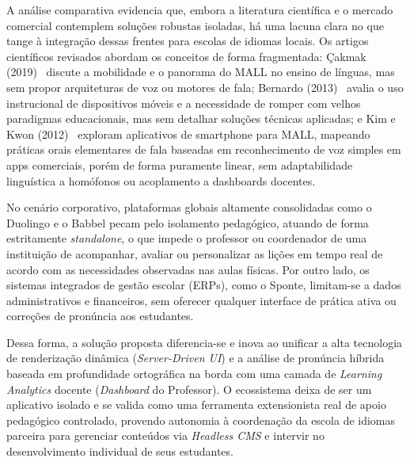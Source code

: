 \documentclass[portuguese]{sbcreviews-2025}%
\begin{document}
A análise comparativa evidencia que, embora a literatura científica e o mercado comercial contemplem soluções robustas isoladas, há uma lacuna clara no que tange à integração dessas frentes para escolas de idiomas locais. Os artigos científicos revisados abordam os conceitos de forma fragmentada: Çakmak (2019)~\cite{cakmak2019} discute a mobilidade e o panorama do MALL no ensino de línguas, mas sem propor arquiteturas de voz ou motores de fala; Bernardo (2013)~\cite{bernardo2013} avalia o uso instrucional de dispositivos móveis e a necessidade de romper com velhos paradigmas educacionais, mas sem detalhar soluções técnicas aplicadas; e Kim e Kwon (2012)~\cite{kim2012} exploram aplicativos de smartphone para MALL, mapeando práticas orais elementares de fala baseadas em reconhecimento de voz simples em apps comerciais, porém de forma puramente linear, sem adaptabilidade linguística a homófonos ou acoplamento a dashboards docentes.

No cenário corporativo, plataformas globais altamente consolidadas como o Duolingo e o Babbel pecam pelo isolamento pedagógico, atuando de forma estritamente \textit{standalone}, o que impede o professor ou coordenador de uma instituição de acompanhar, avaliar ou personalizar as lições em tempo real de acordo com as necessidades observadas nas aulas físicas. Por outro lado, os sistemas integrados de gestão escolar (ERPs), como o Sponte, limitam-se a dados administrativos e financeiros, sem oferecer qualquer interface de prática ativa ou correções de pronúncia aos estudantes.

Dessa forma, a solução proposta diferencia-se e inova ao unificar a alta tecnologia de renderização dinâmica (\textit{Server-Driven UI}) e a análise de pronúncia híbrida baseada em profundidade ortográfica na borda com uma camada de \textit{Learning Analytics} docente (\textit{Dashboard} do Professor). O ecossistema deixa de ser um aplicativo isolado e se valida como uma ferramenta extensionista real de apoio pedagógico controlado, provendo autonomia à coordenação da escola de idiomas parceira para gerenciar conteúdos via \textit{Headless CMS} e intervir no desenvolvimento individual de seus estudantes.
\end{document}

